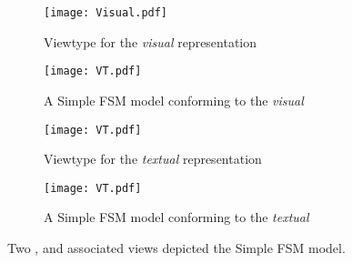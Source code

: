 \begin{figure*}
    \centering
    \begin{subfigure}[b]{0.45\textwidth}
			\centering
      \texttt{[image: Visual.pdf]}
      \caption{Viewtype for the \emph{visual} representation}
      \label{fig:FSM:Init}
    \end{subfigure}
    \hfill
    \begin{subfigure}[b]{0.45\textwidth}
			\centering
      \texttt{[image: VT.pdf]}
      \caption{A \textsf{Simple FSM} model conforming to the \emph{visual} \viewtype}
      \label{fig:FSM:Relevant}
    \end{subfigure}
    \hfill
    \begin{subfigure}[b]{0.45\textwidth}
			\centering
      \texttt{[image: VT.pdf]}
      \caption{Viewtype for the \emph{textual} representation }
      \label{fig:FSM:Guard}
    \end{subfigure}
    \hfill
    \begin{subfigure}[b]{0.45\textwidth}
			\centering
      \texttt{[image: VT.pdf]}
      \caption{A \textsf{Simple FSM} model conforming to the \emph{textual} \viewtype}
      \label{fig:FSM:Guard}
    \end{subfigure}
    \caption{Two \viewtypes, and associated views depicted the \textsf{Simple FSM} model.}
    \label{fig:FSM}
\end{figure*}
